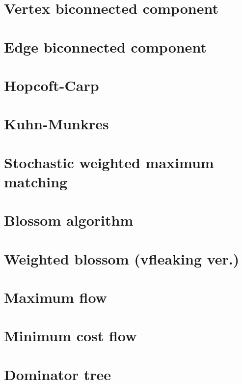 \documentclass[UTF8,a4paper]{report}
\begin{document}
		\section{Vertex biconnected component}
			
		\section{Edge biconnected component}
			
		\section{Hopcoft-Carp}
			
		\section{Kuhn-Munkres}
			
		\section{Stochastic weighted maximum matching}
			
		\section{Blossom algorithm}
			
		\section{Weighted blossom (vfleaking ver.)}	
			
		\section{Maximum flow}
			
		\section{Minimum cost flow}
			
		\section{Dominator tree}
			
\end{document}
